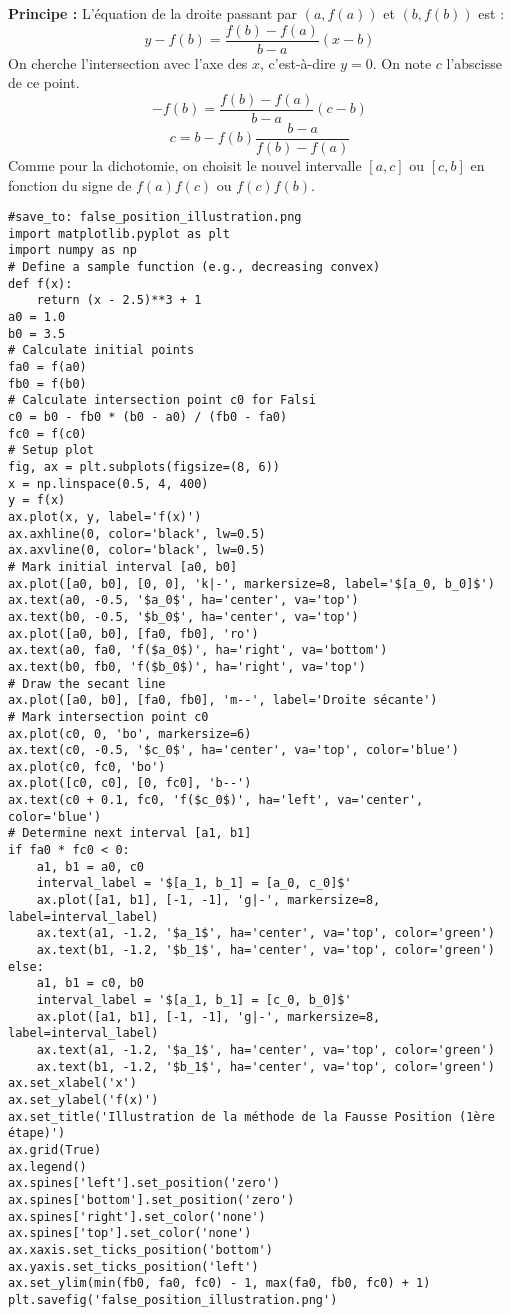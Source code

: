 \documentclass{article}
\begin{document}
\textbf{Principe :} %
L'équation de la droite passant par $(a, f(a))$ et $(b, f(b))$ est :
\[ y - f(b) = \frac{f(b) - f(a)}{b - a} (x - b) \]
On cherche l'intersection avec l'axe des $x$, c'est-à-dire $y=0$. On note $c$ l'abscisse de ce point.
\[ -f(b) = \frac{f(b) - f(a)}{b - a} (c - b) \]
\[ c = b - f(b) \frac{b - a}{f(b) - f(a)} \]
Comme pour la dichotomie, on choisit le nouvel intervalle $[a, c]$ ou $[c, b]$ en fonction du signe de $f(a)f(c)$ ou $f(c)f(b)$.

\begin{verbatim}
#save_to: false_position_illustration.png
import matplotlib.pyplot as plt
import numpy as np
# Define a sample function (e.g., decreasing convex)
def f(x):
    return (x - 2.5)**3 + 1
a0 = 1.0
b0 = 3.5
# Calculate initial points
fa0 = f(a0)
fb0 = f(b0)
# Calculate intersection point c0 for Falsi
c0 = b0 - fb0 * (b0 - a0) / (fb0 - fa0)
fc0 = f(c0)
# Setup plot
fig, ax = plt.subplots(figsize=(8, 6))
x = np.linspace(0.5, 4, 400)
y = f(x)
ax.plot(x, y, label='f(x)')
ax.axhline(0, color='black', lw=0.5)
ax.axvline(0, color='black', lw=0.5)
# Mark initial interval [a0, b0]
ax.plot([a0, b0], [0, 0], 'k|-', markersize=8, label='$[a_0, b_0]$')
ax.text(a0, -0.5, '$a_0$', ha='center', va='top')
ax.text(b0, -0.5, '$b_0$', ha='center', va='top')
ax.plot([a0, b0], [fa0, fb0], 'ro')
ax.text(a0, fa0, 'f($a_0$)', ha='right', va='bottom')
ax.text(b0, fb0, 'f($b_0$)', ha='right', va='top')
# Draw the secant line
ax.plot([a0, b0], [fa0, fb0], 'm--', label='Droite sécante')
# Mark intersection point c0
ax.plot(c0, 0, 'bo', markersize=6)
ax.text(c0, -0.5, '$c_0$', ha='center', va='top', color='blue')
ax.plot(c0, fc0, 'bo')
ax.plot([c0, c0], [0, fc0], 'b--')
ax.text(c0 + 0.1, fc0, 'f($c_0$)', ha='left', va='center', color='blue')
# Determine next interval [a1, b1]
if fa0 * fc0 < 0:
    a1, b1 = a0, c0
    interval_label = '$[a_1, b_1] = [a_0, c_0]$'
    ax.plot([a1, b1], [-1, -1], 'g|-', markersize=8, label=interval_label)
    ax.text(a1, -1.2, '$a_1$', ha='center', va='top', color='green')
    ax.text(b1, -1.2, '$b_1$', ha='center', va='top', color='green')
else:
    a1, b1 = c0, b0
    interval_label = '$[a_1, b_1] = [c_0, b_0]$'
    ax.plot([a1, b1], [-1, -1], 'g|-', markersize=8, label=interval_label)
    ax.text(a1, -1.2, '$a_1$', ha='center', va='top', color='green')
    ax.text(b1, -1.2, '$b_1$', ha='center', va='top', color='green')
ax.set_xlabel('x')
ax.set_ylabel('f(x)')
ax.set_title('Illustration de la méthode de la Fausse Position (1ère étape)')
ax.grid(True)
ax.legend()
ax.spines['left'].set_position('zero')
ax.spines['bottom'].set_position('zero')
ax.spines['right'].set_color('none')
ax.spines['top'].set_color('none')
ax.xaxis.set_ticks_position('bottom')
ax.yaxis.set_ticks_position('left')
ax.set_ylim(min(fb0, fa0, fc0) - 1, max(fa0, fb0, fc0) + 1)
plt.savefig('false_position_illustration.png')
\end{verbatim}
\end{document}
